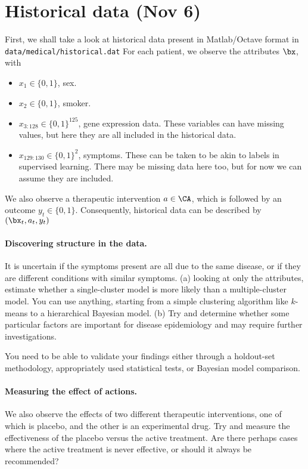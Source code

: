 
\section{Historical data (Nov 6)}

First, we shall take a look at historical data present in Matlab/Octave format in
\texttt{data/medical/historical.dat}
For each patient, we observe the attributes $\bx$, with
\begin{itemize}
\item $x_1 \in \{0,1\}$, sex.
\item $x_2 \in \{0,1\}$, smoker.
\item $x_{3:128} \in \{0,1\}^{125}$, gene expression data. These variables can have missing values, but here they are all included in the historical data.
\item $x_{129:130} \in \{0,1\}^2$, symptoms. These can be taken to be akin to labels in supervised learning. There may be missing data here too, but for now we can assume they are included.
\end{itemize}
We also observe a therapeutic intervention $a \in \CA$, which is followed by an outcome $y_t \in \{0,1\}$. Consequently, historical data can be described by $(\bx_t, a_t, y_t)$

\paragraph{Discovering structure in the data.}
It is uncertain if the symptoms present are all due to the same disease, or if they are different conditions with similar symptoms. (a) looking at only the attributes, estimate whether a single-cluster model is more likely than a multiple-cluster model. You can use anything, starting from a simple clustering algorithm like $k$-means to a hierarchical Bayesian model. (b) Try and determine whether some particular factors are important for disease epidemiology and may require further investigations.

You need to be able to validate your findings either through a holdout-set methodology, appropriately used statistical tests, or Bayesian model comparison.

\paragraph{Measuring the effect of actions.}
We also observe the effects of two different therapeutic interventions, one of which is placebo, and the other is an experimental drug. Try and measure the effectiveness of the placebo versus the active treatment. Are there perhaps cases where the active treatment is never effective, or should it always be recommended?


